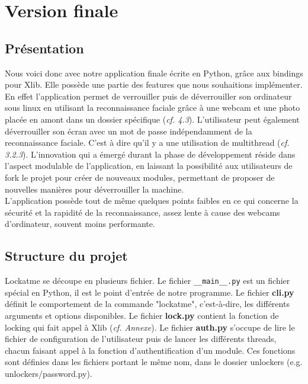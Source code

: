\documentclass[french]{report}
\begin{document}
\chapter{Version finale}

\newpage

\section{Présentation}
Nous voici donc avec notre application finale écrite en Python, grâce aux bindings
pour Xlib. Elle possède une partie des features que nous souhaitions
implémenter. En effet l'application permet de verrouiller puis de déverrouiller son ordinateur sous linux
en utilisant la reconnaissance faciale grâce à une webcam et une photo placée
en amont dans un dossier spécifique (\emph{cf. 4.3}). L'utilisateur peut également déverrouiller
son écran avec un mot de passe indépendamment de la reconnaissance faciale. C'est
à dire qu'il y a une utilisation de multithread (\emph{cf. 3.2.3}).
L'innovation qui a émergé durant la phase de développement réside dans
l'aspect modulable de l'application, en laissant la possibilité aux utilisateurs
de fork le projet pour créer de nouveaux modules, permettant de proposer de nouvelles manières pour
déverrouiller la machine.\\
L'application possède tout de même quelques points faibles en ce qui concerne la
sécurité et la rapidité de la reconnaissance, assez lente à cause des webcams
d'ordinateur, souvent moins performante.

\section{Structure du projet}
Lockatme se découpe en plusieurs fichier. Le fichier \texttt{\_\_main\_\_.py} est un fichier
spécial en Python, il est le point d'entrée de notre programme. Le fichier \textbf{cli.py}
définit le comportement de la commande "lockatme", c'est-à-dire, les différents
arguments et options disponibles.
Le fichier \textbf{lock.py} contient la fonction de locking qui fait appel à Xlib (\emph{cf. Annexe}).
Le fichier \textbf{auth.py} s'occupe de lire le fichier de configuration de l'utilisateur
puis de lancer les différents threads, chacun faisant appel à la fonction
d'authentification d'un module. Ces fonctions sont définies dans les
fichiers portant le même nom, dans le dossier unlockers (e.g. unlockers/password.py).
\end{document}
